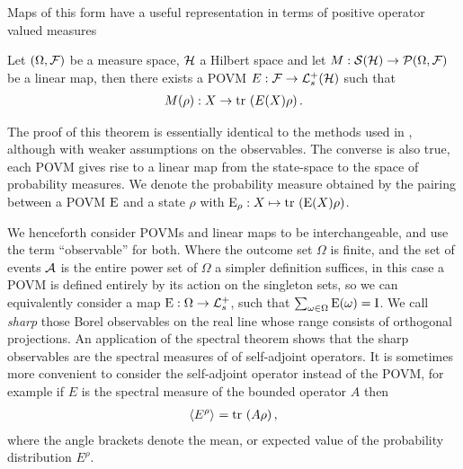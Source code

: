Maps of this form have a useful representation in terms of positive operator valued measures
\begin{thm}
  Let $(\Omega,\mathcal{F})$ be a measure space, $\mathcal{H}$ a Hilbert space and let $M:\dops[\hcal]\to\probs{\Omega}{\fcal}$ be a linear map, then there exists a POVM $E:\fcal\to\posops[\hcal]$ such that
  \begin{align}
    M(\rho):X\to \tr{E(X)\rho}.
  \end{align}
\end{thm}
The proof of this theorem is essentially identical to the methods used in \cite{Neumann1927}, although with weaker assumptions on the observables. The converse is also true, each POVM gives rise to a linear map from the state-space to the space of probability measures. We denote the probability measure obtained by the pairing between a POVM $\operatorname{E}$ and a state $\rho$ with $\ope_\rho:X\mapsto \tr{\ope(X)\rho}$.

We henceforth consider POVMs and linear maps to be interchangeable, and use the term ``observable'' for both. Where the outcome set $\Omega$ is finite, and the set of events $\mathcal{A}$ is the entire power set of $\Omega$ a simpler definition suffices, in this case a POVM is defined entirely by its action on the singleton sets, so we can equivalently consider a map $\ope:\Omega\to\posops$, such that $\sum_{\omega\in\Omega} \operatorname{E}(\omega) = \operatorname{I}$. 
We call \emph{sharp} those Borel observables on the real line whose range consists of orthogonal projections. An application of the spectral theorem shows that the sharp observables are the spectral measures of of self-adjoint operators. It is sometimes more convenient to consider the self-adjoint operator instead of the POVM, for example if $E$ is the spectral measure of the bounded operator $A$ then
\begin{align}
  \expe{E^\rho}{} = \tr{A\rho},
\end{align}
where the angle brackets denote the mean, or expected value of the probability distribution $E^\rho$.  


